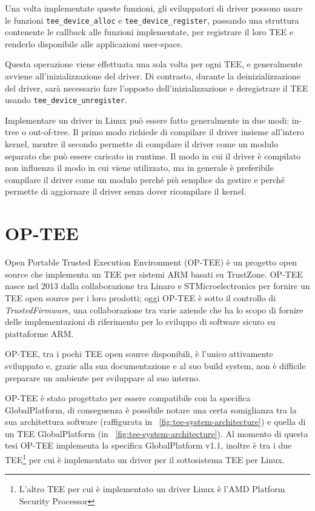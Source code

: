 \documentclass[12pt,italian]{report}
\begin{document}
Una volta implementate queste funzioni, gli sviluppatori di driver
possono usare le funzioni \texttt{tee\_device\_alloc} e
\texttt{tee\_device\_register}, passando una struttura contenente
le callback alle funzioni implementate, per registrare il loro TEE
e renderlo disponibile alle applicazioni user-space.

Questa operazione viene effettuata una sola volta per ogni TEE, e
generalmente avviene all'inizializzazione del driver.
Di contrasto, durante la deinizializzazione del driver, sarà necessario
fare l'opposto dell'inizializzazione e deregistrare il TEE usando
\texttt{tee\_device\_unregister}.

\bigbreak \noindent

Implementare un driver in Linux può essere fatto generalmente in due modi:
in-tree o out-of-tree. Il primo modo richiede di compilare il driver insieme
all'intero kernel, mentre il secondo permette di compilare il driver come un
modulo separato che può essere caricato in runtime.
Il modo in cui il driver è compilato non influenza il modo in cui viene
utilizzato, ma in generale è preferibile compilare il driver come un modulo
perché più semplice da gestire e perché permette di aggiornare il driver
senza dover ricompilare il kernel.

\section{OP-TEE}
\label{sec:architettura-op-tee}
Open Portable Trusted Execution Environment (OP-TEE)\cite{optee}
è un progetto open source
che implementa un TEE per sistemi ARM basati su TrustZone.
OP-TEE nasce nel 2013 dalla collaborazione tra Linaro e STMicroelectronics
per fornire un TEE open source per i loro prodotti; oggi OP-TEE è sotto
il controllo di \textit{TrustedFirmware}, una collaborazione tra varie
aziende che ha lo scopo di fornire delle implementazioni di riferimento
per lo sviluppo di software sicuro su piattaforme ARM.

OP-TEE, tra i pochi TEE open source disponibili, è l'unico attivamente
sviluppato e, grazie alla sua documentazione e al suo build system, non
è difficile preparare un ambiente per sviluppare al suo interno.

OP-TEE è stato progettato per essere compatibile con la specifica
GlobalPlatform, di conseguenza è possibile notare una certa somiglianza
tra la sua architettura software (raffigurata in
\figurename~\ref{fig:tee-system-architecture})
e quella di un TEE GlobalPlatform
(in \figurename~\ref{fig:tee-system-architecture}).
Al momento di questa tesi OP-TEE implementa la specifica GlobalPlatform v1.1,
inoltre è tra i due TEE\footnote{
        L'altro TEE per cui è implementato un driver Linux è
        l'AMD Platform Security Processor
} per cui è implementato un driver per il sottosistema TEE per Linux.
\end{document}
